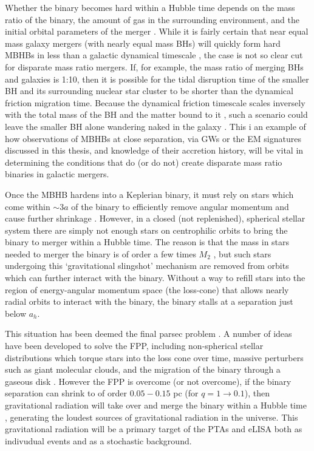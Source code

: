 Whether the binary becomes hard within a Hubble time depends on the mass ratio
of the binary, the amount of gas in the surrounding environment, and the
initial orbital parameters of the merger \citep{Mayer:2013:MBHBGasRev}. While
it is fairly certain that near equal mass galaxy mergers (with nearly equal
mass BHs) will quickly form hard MBHBs in less than a galactic dynamical
timescale \citep{Mayer+2007, Chapon+2013}, the case is not so clear cut for
disparate mass ratio mergers. If, for example, the mass ratio of merging BHs
and galaxies is 1:10, then it is possible for the tidal disruption time of the
smaller BH and its surrounding nuclear star cluster to be shorter than the
dynamical friction migration time. Because the dynamical friction timescale
scales inversely with the total mass of the BH and the matter bound to it
\citep{Chandrasekhar:1943, ColpiDotti:2011:rev}, such a scenario could leave
the smaller BH alone wandering naked in the galaxy \citep{Callegari:2011,
Mayer:2013:MBHBGasRev}. This i an example of how observations of MBHBs at
close separation, via GWs or the EM signatures discussed in this thesis, and
knowledge of their accretion history, will be vital in determining the
conditions that do (or do not) create disparate mass ratio binaries in
galactic mergers.

Once the MBHB hardens into a Keplerian binary, it must rely on stars which
come within $\sim3a$ of the binary to efficiently remove angular momentum and
cause further shrinkage \citep{Saslaw:1974}. However, in a closed (not
replenished),  spherical stellar system there are simply not enough stars on
centrophilic orbits to bring the binary to merger within a Hubble time. The
reason is that the mass in stars needed to merger the binary is of order a few
times $M_2$ \citep{MerrittMilos:2005:LRR}, but such stars undergoing this
`gravitational slingshot' mechanism are removed from orbits which can further
interact with the binary. Without a way to refill stars into the region of
energy-angular momentum space (the loss-cone) that allows nearly radial orbits
to interact with the binary, the binary stalls at a separation just below
$a_h$.

This situation has been deemed the final parsec problem
\citep[FPP][]{Milosavljevic:2003:FPcP}. A number of ideas have been developed to
solve the FPP, including non-spherical stellar distributions which torque
stars into the loss cone over time, massive
perturbers such as giant molecular clouds, and the
migration of the binary through a gaseous disk \citep{Goicovic:2016, GouldRix:2000,
ArmNat:2002:ApJL}. %
However the FPP is overcome (or not overcome), if the binary separation can shrink to of order $0.05-0.15$ pc (for $q=1 \rightarrow 0.1$), then gravitational radiation
will take over and merge the binary within a Hubble time \citep{Peters64},
generating the loudest sources of gravitational radiation in the universe.
This gravitational radiation will be a primary target of the PTAs and eLISA
both as indivudual events and as a stochastic background.

